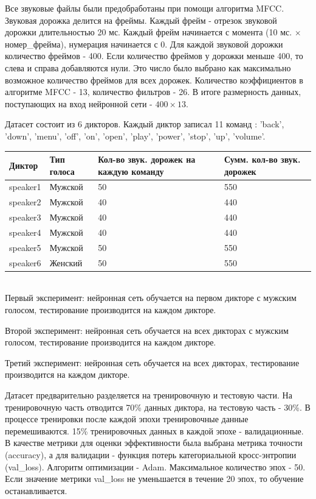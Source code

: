 \documentclass[14pt]{article}
\begin{document}
Все звуковые файлы были предобработаны при помощи алгоритма MFCC.
Звуковая дорожка делится на фреймы. Каждый фрейм - отрезок звуковой дорожки длительностью 20 мс. Каждый фрейм начинается с момента (10 мс. $\times$ номер\_фрейма), нумерация начинается с 0. Для каждой звуковой дорожки количество фреймов - 400. Если количество фреймов у дорожки меньше 400, то слева и справа добавляются нули. Это число было выбрано как максимально возможное количество фреймов для всех дорожек. Количество коэффициентов в алгоритме MFCC - 13, количество фильтров - 26. В итоге размерность данных, поступающих на вход нейронной сети - $400\times13$.

Датасет состоит из 6 дикторов. Каждый диктор записал 11 команд : 'back', 'down', 'menu', 'off', 'on', 'open', 'play', 'power', 'stop', 'up', 'volume'.
\\

\begin{tabular}[c]{ | p{2cm} | p{2cm} | p{6cm} | p{4cm} | }
\hline
Диктор & Тип голоса & Кол-во звук. дорожек на каждую команду & Сумм. кол-во звук. дорожек  \\ \hline
speaker1 & Мужской & 50 & 550 \\
speaker2 & Мужской & 40 & 440 \\
speaker3 & Мужской & 40 & 440 \\
speaker4 & Мужской & 40 & 440 \\
speaker5 & Мужской & 50 & 550 \\
speaker6 & Женский & 50 & 550 \\ \hline
\end{tabular}
\\

Первый эксперимент: нейронная сеть обучается на первом дикторе с мужским голосом, тестирование производится на каждом дикторе. 

Второй эксперимент: нейронная сеть обучается на всех дикторах с мужским голосом, тестирование производится на каждом дикторе. 

Третий эксперимент: нейронная сеть обучается на всех дикторах, тестирование производится на каждом дикторе.

Датасет предварительно разделяется на тренировочную и тестовую части. На тренировочную часть отводится 70\% данных диктора, на тестовую часть - 30\%. В процессе тренировки после каждой эпохи тренировочные данные перемешиваются. 15\% тренировочных данных в каждой эпохе - валидационные. В качестве метрики для оценки эффективности была выбрана метрика точности (accuracy), а для валидации - функция потерь категориальной кросс-энтропии (val\_loss). Алгоритм оптимизации - Adam. Максимальное количество эпох - 50. Если значение метрики val\_loss не уменьшается в течение 20 эпох, то обучение останавливается.
\end{document}
